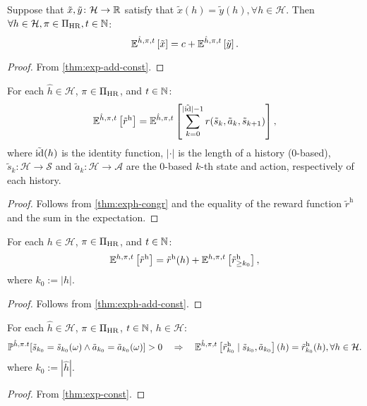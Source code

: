 \begin{theorem} \label{thm:exph-add-const}
Suppose that $\tilde{x}, \tilde{y} \colon \mathcal{H} \to \mathbb{R} $ satisfy that $\tilde{x}(h) = \tilde{y}(h), \forall h \in \mathcal{H}$. Then $\forall h\in \mathcal{H}, \pi\in \Pi_{\mathrm{HR}}, t \in \mathbb{N}$:
\[
  \mathbb{E}^{\hat{h}, \pi, t} \left[ \tilde{x} \right]
  =
  c + \mathbb{E}^{\hat{h}, \pi, t} \left[ \tilde{y} \right].
\]
\end{theorem}
\begin{proof}
From \cref{thm:exp-add-const}.
\end{proof}

\begin{theorem}\label{thm:expret-eq-sum-rew}
For each $\hat{h}\in \mathcal{H}$, $\pi \in \Pi_{\mathrm{HR}}$, and $t\in \mathbb{N}$:
\[
\mathbb{E}^{\hat{h}, \pi, t} \left[ \tilde{r}^{\mathrm{h}} \right]
=
\mathbb{E}^{\hat{h}, \pi, t} \left[ \sum_{k=0}^{|\tilde{\operatorname{id}}|-1}  r(\tilde{s}_k, \tilde{a}_k, \tilde{s}_{k+1}) \right],
\]
where $\tilde{\operatorname{id}}(h)$ is the identity function, $|\cdot|$ is the length of a history (0-based), $\tilde{s}_k\colon \mathcal{H} \to \mathcal{S}$ and $\tilde{a}_k\colon \mathcal{H} \to \mathcal{A}$ are the 0-based $k$-th state and action, respectively of each history.
\end{theorem}
\begin{proof}
Follows from \cref{thm:exph-congr} and the equality of the reward function $\tilde{r}^{\mathrm{h}}$ and the sum in the expectation.
\end{proof}

\begin{theorem}\label{thm:sum-rew-eq-sum-rew-rg}
For each $h\in \mathcal{H}$, $\pi \in \Pi_{\mathrm{HR}}$, and $t\in \mathbb{N}$:
\[
\mathbb{E}^{h, \pi, t} \left[  \tilde{r}^{\mathrm{h}} \right]
=
\tilde{r}^{\mathrm{h}}(h) + \mathbb{E}^{h, \pi, t} \left[ \tilde{r}^{\mathrm{h}}_{\ge k_0} \right],
\]
where $k_0:=|h|$.
\end{theorem}
\begin{proof}
Follows from \cref{thm:exph-add-const}.
\end{proof}

\begin{theorem}\label{thm:sum-rew-cnd}
For each $\hat{h}\in \mathcal{H}$, $\pi \in \Pi_{\mathrm{HR}}$, $t\in \mathbb{N}$, $h\in \mathcal{H}$:
\begin{equation*}
  \mathbb{P}^{\hat{h},\pi.t}[\tilde{s}_{k_0}=\tilde{s}_{k_0}(\omega) \wedge \tilde{a}_{k_0} = \tilde{a}_{k_0}(\omega) ] > 0
\quad\Rightarrow \quad
  \mathbb{E}^{\hat{h}, \pi, t} \left[ \tilde{r}^{\mathrm{h}}_{k_0} \mid  \tilde{s}_{k_0}, \tilde{a}_{k_0}\right](h) = \tilde{r}^{\mathrm{h}}_{k_0}(h), \forall h \in \mathcal{H}.
\end{equation*}
where $k_0:= |\hat{h}|$.
\end{theorem}
\begin{proof}
 From \cref{thm:exp-const}. 
\end{proof}

